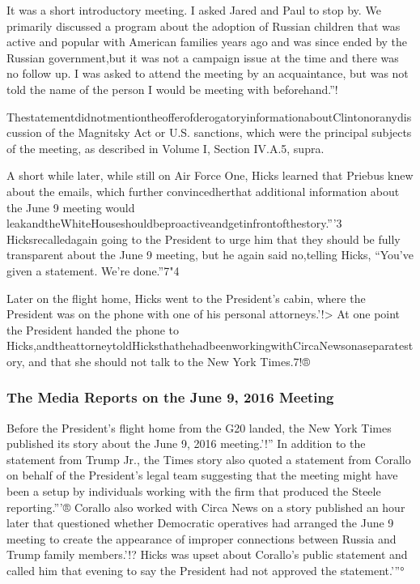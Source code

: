It was a short introductory meeting. I asked Jared and Paul to stop by. We primarily discussed a program about the adoption of Russian children that was active and popular with American families years ago and was since ended by the Russian government,but it was not a campaign issue at the time and there was no follow up. I was asked to attend the meeting by an acquaintance, but was not told the name of the person I would be meeting with beforehand.”!

ThestatementdidnotmentiontheofferofderogatoryinformationaboutClintonoranydiscussion of the Magnitsky Act or U.S. sanctions, which were the principal subjects of the meeting, as described in Volume I, Section IV.A.5, supra.

A short while later, while still on Air Force One, Hicks learned that Priebus knew about the emails, which further convincedherthat additional information about the June 9 meeting would leakandtheWhiteHouseshouldbeproactiveandgetinfrontofthestory.”'3 Hicksrecalledagain going to the President to urge him that they should be fully transparent about the June 9 meeting, but he again said no,telling Hicks, “You've given a statement. We're done.”7"4

Later on the flight home, Hicks went to the President's cabin, where the President was on the phone with one of his personal attorneys.'!> At one point the President handed the phone to Hicks,andtheattorneytoldHicksthathehadbeenworkingwithCircaNewsonaseparatestory, and that she should not talk to the New York Times.7!®

\subsubsection{The Media Reports on the June 9, 2016 Meeting}

Before the President's flight home from the G20 landed, the New York Times published its story about the June 9, 2016 meeting.'!” In addition to the statement from Trump Jr., the Times story also quoted a statement from Corallo on behalf of the President's legal team suggesting that the meeting might have been a setup by individuals working with the firm that produced the Steele reporting.”'® Corallo also worked with Circa News on a story published an hour later that questioned whether Democratic operatives had arranged the June 9 meeting to create the appearance of improper connections between Russia and Trump family members.'!? Hicks was upset about Corallo's public statement and called him that evening to say the President had not approved the statement.'”°

